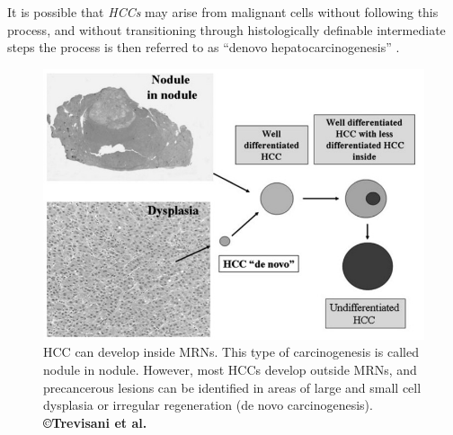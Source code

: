 \documentclass[]{article}
\begin{document}
It is possible that \emph{HCCs} may arise from malignant cells without
following this process, and without transitioning through histologically
definable intermediate steps the process is then referred to as ``denovo
hepatocarcinogenesis'' \cite{Taguchi2002}.


\begin{figure}[th!]
\centering
\includegraphics[width=0.7\linewidth]{images/image3}
\caption{HCC can develop inside MRNs. This type of carcinogenesis is called nodule in nodule. However, most HCCs develop outside MRNs, and precancerous lesions can be identified in areas of large and small cell dysplasia or irregular regeneration (de novo carcinogenesis). \textbf{©Trevisani et al.} \cite{Trevisani2008a}}
\label{Trevisani2008_Fig2}
\end{figure}
\end{document}
